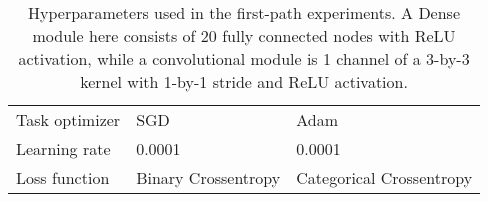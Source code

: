 \begin{table}[ht]
\begin{tabular}{lll}
Task optimizer         & SGD                                                                                          & Adam                                                                                                                                                              \\
Learning rate          & 0.0001                                                                                       & 0.0001                                                                                                                                                            \\
Loss function          & Binary Crossentropy                                                                          & Categorical Crossentropy                                                                                                                                         
\end{tabular}
\caption{Hyperparameters used in the first-path experiments. A Dense module here consists of 20 fully connected nodes with ReLU activation, while a convolutional module is 1 channel of a 3-by-3 kernel with 1-by-1 stride and ReLU activation.}
\label{tab:hyperparam}
\end{table}